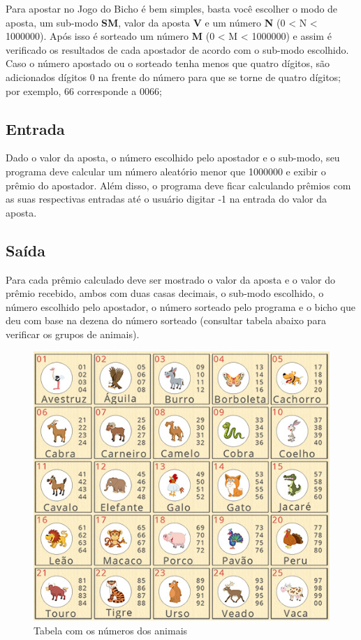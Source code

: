 \documentclass{article}
\begin{document}
Para apostar no Jogo do Bicho é bem simples, basta você escolher o modo de aposta, um sub-modo \textbf{SM}, valor da aposta \textbf{V} e um número \textbf{N} (0 < N < 1000000). Após isso é sorteado um número \textbf{M} (0 < M < 1000000) e assim é verificado os resultados de cada apostador de acordo com o sub-modo escolhido. Caso o número apostado ou o sorteado tenha menos que quatro dígitos, são adicionados dígitos 0 na frente do número para que se torne de quatro dígitos; por exemplo, 66 corresponde a 0066;

\subsection{Entrada}
Dado o valor da aposta, o número escolhido pelo apostador e o sub-modo, seu programa deve calcular um número aleatório menor que 1000000 e exibir o prêmio do apostador. Além disso, o programa deve ficar calculando prêmios com as suas respectivas entradas até o usuário digitar -1 na entrada do valor da aposta.

\subsection{Saída}
Para cada prêmio calculado deve ser mostrado o valor da aposta e o valor do prêmio recebido, ambos com duas casas decimais, o sub-modo escolhido, o número escolhido pelo apostador, o número sorteado pelo programa e o bicho que deu com base na dezena do número sorteado (consultar tabela abaixo para verificar os grupos de animais).

\begin{figure}[!h]
	\centering
	\includegraphics[scale=0.5]{tabela-de-resultados.jpg}
	\caption{Tabela com os números dos animais}
\end{figure}
\end{document}
